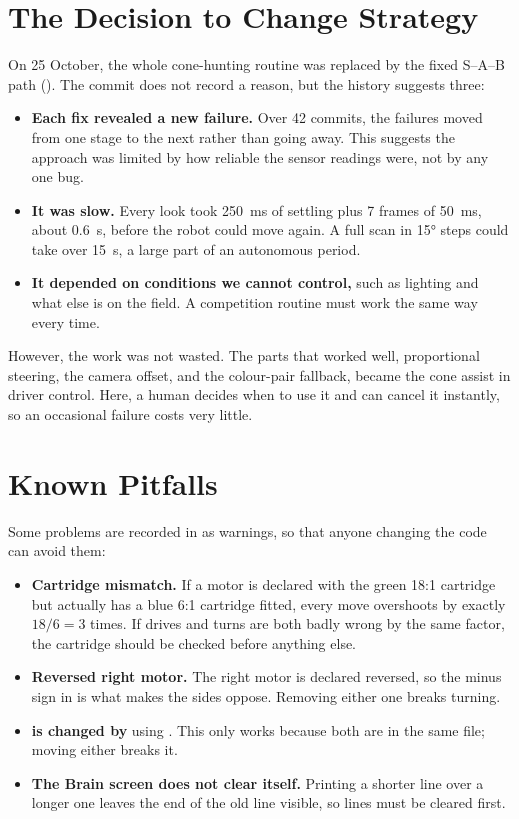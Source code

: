 \section{The Decision to Change Strategy}
\label{sec:ch-decision}

On 25 October, the whole cone-hunting routine was replaced by the fixed S--A--B
path (). The commit does not record a reason, but the history
suggests three:

\begin{itemize}
  \item \textbf{Each fix revealed a new failure.} Over 42 commits, the failures
    moved from one stage to the next rather than going away. This suggests the
    approach was limited by how reliable the sensor readings were, not by any one
    bug.
  \item \textbf{It was slow.} Every look took 250~ms of settling plus 7 frames of
    50~ms, about 0.6~s, before the robot could move again. A full scan in 15° steps
    could take over 15~s, a large part of an autonomous period.
  \item \textbf{It depended on conditions we cannot control,} such as lighting and
    what else is on the field. A competition routine must work the same way every
    time.
\end{itemize}

However, the work was not wasted. The parts that worked well, proportional
steering, the camera offset, and the colour-pair fallback, became the cone assist
in driver control. Here, a human decides when to use it and can cancel it
instantly, so an occasional failure costs very little.

\section{Known Pitfalls}
\label{sec:gotchas}

Some problems are recorded in  as warnings, so that anyone
changing the code can avoid them:

\begin{itemize}
  \item \textbf{Cartridge mismatch.} If a motor is declared with the green 18:1
    cartridge but actually has a blue 6:1 cartridge fitted, every move overshoots
    by exactly $18/6 = 3$ times. If drives and turns are both badly wrong by the
    same factor, the cartridge should be checked before anything else.
  \item \textbf{Reversed right motor.} The right motor is declared reversed, so the
    minus sign in  is what makes the sides oppose. Removing either
    one breaks turning.
  \item \textbf{ is changed by } using
    . This only works because both are in the same file; moving
    either breaks it.
  \item \textbf{The Brain screen does not clear itself.} Printing a shorter line over
    a longer one leaves the end of the old line visible, so lines must be cleared
    first.
\end{itemize}

